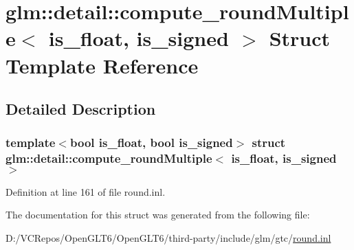 \hypertarget{structglm_1_1detail_1_1compute__round_multiple}{}\section{glm\+::detail\+::compute\+\_\+round\+Multiple$<$ is\+\_\+float, is\+\_\+signed $>$ Struct Template Reference}
\label{structglm_1_1detail_1_1compute__round_multiple}


\subsection{Detailed Description}
\subsubsection*{template$<$bool is\+\_\+float, bool is\+\_\+signed$>$\newline
struct glm\+::detail\+::compute\+\_\+round\+Multiple$<$ is\+\_\+float, is\+\_\+signed $>$}



Definition at line 161 of file round.\+inl.



The documentation for this struct was generated from the following file\+:\begin{DoxyCompactItemize}
\item 
D\+:/\+V\+C\+Repos/\+Open\+G\+L\+T6/\+Open\+G\+L\+T6/third-\/party/include/glm/gtc/\mbox{\hyperlink{round_8inl}{round.\+inl}}\end{DoxyCompactItemize}
